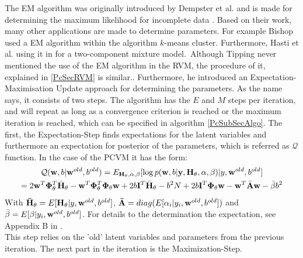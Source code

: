 The \acs{EM} algorithm was originally introduced by Dempster et al. and is made for determining the maximum likelihood for incomplete data \cite{Dempster.1977}. 
Based on their work, many other applications are made to determine parameters.
For example Bishop used a \acs{EM} algorithm within the algorithm $k$-means cluster.\cite[p. 426-428]{Bishop.2009}
Furthermore, Hasti et al. using it in \cite[p. 272-276]{TrevorHastie.2009} for a two-component mixture model.\
Although Tipping never mentioned the use of the \acs{EM} algorithm in the \acs{RVM}, the procedure of it, explained in \ref{PcSecRVM} is similar.\cite[p. 233-234]{Tipping.2001}.
Furthermore, he introduced an Expectation-Maximisation Update approach for determining the parameters.\cite[. 235]{Tipping.2001} \newline
As the name says, it consists of two steps.
The algorithm has the $E$ and $M$ steps per iteration, and will repeat as long as a convergence criterion is reached or the maximum iteration is reached, which can be specified in algorithm \ref{PcSubSecAlgo}.
The first, the Expectation-Step finds expectations for the latent variables and furthermore an expectation for posterior of the parameters, which is referred as $\mathcal{Q}$ function.
In the case of the \acs{PCVM} it has the form:\cite{Chen.2009}
\begin{equation}\label{EqPcvmEStep}
\begin{gathered}
\mathcal{Q}(\mathbf{w},b\vert \mathbf{w}^{old},b^{old}) = E_{\mathbf{H}_{\theta},\alpha,\beta}[\log p (\mathbf{w},b \vert \mathbf{y} ,\mathbf{H}_{\theta},\alpha,\beta) | y,\mathbf{w}^{old},b^{old}]\\
= 2\mathbf{w}^T \mathbf{\Phi}_{\theta}^T \bar{\mathbf{H}}_\theta - \mathbf{w}^T \mathbf{\Phi}_{\theta}^T  \mathbf{\Phi}_{\theta} \mathbf{w} + 2b\mathbf{I}^T \bar{\mathbf{H}}_{\theta} -  b^2N + 2b\mathbf{I}^T \mathbf{\Phi}_\theta \mathbf{w}- \mathbf{w}^T\bar{\mathbf{A}}\mathbf{w} - \bar{\beta}b^2
\end{gathered}
\end{equation}
With $\mathbf{\bar{H}}_\theta =  E[\mathbf{H}_\theta \vert y, \mathbf{w}^{old}, b^{old}]$, $\mathbf{\bar{A}} = diag(E[\alpha_i|y_i,\mathbf{w}^{old},b^{old}])$ and $\bar{\beta}=E[\beta\vert y_i,\mathbf{w}^{old},b^{old}]$.
For details to the determination the expectation, see Appendix B in \cite{Chen.2009}.\\
This step relies on the 'old' latent variables and parameters from the previous iteration.
The next part in the iteration is the Maximization-Step.\cite{Chen.2009}\\
